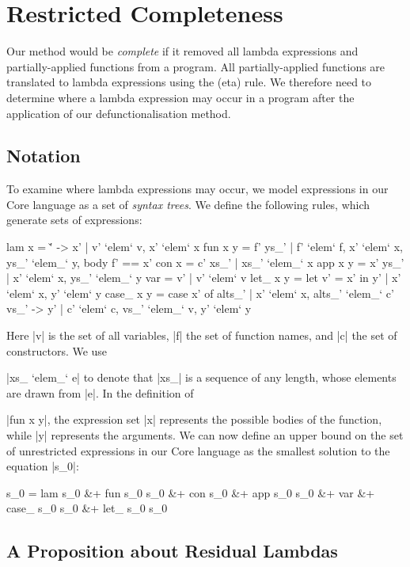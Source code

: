 \section{Restricted Completeness}
\label{secF:completeness}

Our method would be \textit{complete} if it removed all lambda expressions and partially-applied functions from a program. All partially-applied functions are translated to lambda expressions using the (eta) rule. We therefore need to determine where a lambda expression may occur in a program after the application of our defunctionalisation method.

\subsection{Notation}

To examine where lambda expressions may occur, we model expressions in our Core language as a set of \textit{syntax trees}. We define the following rules, which generate sets of expressions:

\ignore\begin{code}
lam x      = {\v' -> x' | v' `elem` v, x' `elem` x}
fun x y    = {f' ys_' | f' `elem` f, x' `elem` x, ys_' `elem_` y, body f' == x'}
con x      = {c' xs_' | xs_' `elem_` x}
app x y    = {x' ys_' | x' `elem` x, ys_' `elem_` y}
var        = {v' | v' `elem` v}
let_ x y   = {let v' = x' in y' | x' `elem` x, y' `elem` y}
case_ x y  = {case  x' of alts_' | x' `elem` x,
                    alts_' `elem_` {c' vs_' -> y' | c' `elem` c, vs_' `elem_` v, y' `elem` y}}
\end{code}

Here |v| is the set of all variables, |f| the set of function names, and |c| the set of constructors. We use \ignore|xs_ `elem_` e| to denote that |xs_| is a sequence of any length, whose elements are drawn from |e|. In the definition of \ignore|fun x y|, the expression set |x| represents the possible bodies of the function, while |y| represents the arguments. We can now define an upper bound on the set of unrestricted expressions in our Core language as the smallest solution to the equation |s_0|:

\ignore\begin{code}
s_0  =  lam s_0 &+ fun s_0 s_0 &+ con s_0 &+ app s_0 s_0 &+ var &+
        case_ s_0 s_0 &+ let_ s_0 s_0
\end{code}

\subsection{A Proposition about Residual Lambdas}

